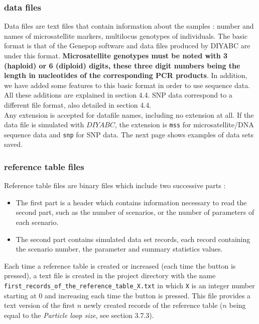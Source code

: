 \subsubsection{data files}
Data files are text files that contain information about the samples : number and names of microsatellite markers, multilocus genotypes of individuals. The basic  format is that of the Genepop software \citep{RR1995} and data files produced by DIYABC are under this format.  \textbf{Microsatellite genotypes must be noted with 3 (haploid) or 6 (diploid) digits, these three digit numbers being the length in nucleotides of the corresponding PCR products}. In addition, we have added some features to this basic format in order to use sequence data. All these additions are explained in section 4.4. SNP data correspond to a different file format, also detailed in section 4.4.\\ 
Any extension is accepted for datafile names, including no extension at all. If the data file is simulated with $DIYABC$, the extension is \texttt{mss} for microsatellite/DNA sequence data and \texttt{snp} for SNP data. The next page shows examples of data sets saved.

\subsubsection{reference table files} 
Reference table files are binary files which include two successive parts :
\begin{itemize}
 \item The first part is a header which contains information necessary to read the second part, such as the number of scenarios, or the number of parameters of each scenario.
 \item The second part contains simulated data set records, each record containing the scenario number, the parameter and summary statistics values.
\end{itemize}
 
 Each time a reference table is created or increased (each time the  button is pressed), a text file is created in the project directory with the name \texttt{first\_records\_of\_the\_reference\_table\_X.txt} in which \texttt{X} is an integer number starting at 0 and increasing each time the  button is pressed. This file provides a text version of the first $n$ newly created records of the reference table ($n$ being equal to the \emph{Particle loop size}, see section 3.7.3).\\

